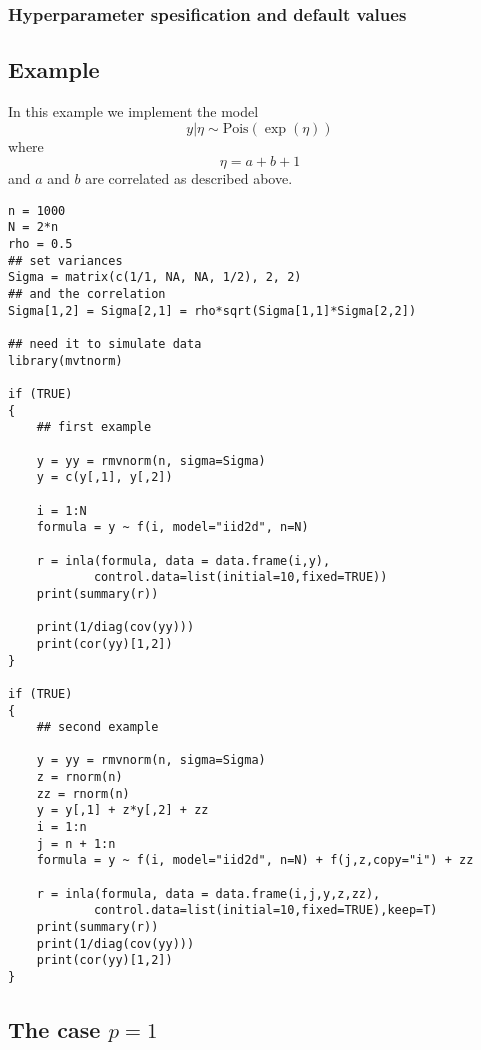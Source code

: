 \documentclass[a4paper,11pt]{article}
\begin{document}
\subsubsection*{Hyperparameter spesification and default values}



\subsection*{Example}
In this example we implement the model
\begin{displaymath}
    y|\eta\sim\mbox{Pois}(\exp(\eta))
\end{displaymath}
where
\begin{displaymath}
    \eta=a+b+1
\end{displaymath}
and $a$ and $b$ are correlated as described above.

\begin{verbatim}
n = 1000
N = 2*n
rho = 0.5
## set variances
Sigma = matrix(c(1/1, NA, NA, 1/2), 2, 2)
## and the correlation
Sigma[1,2] = Sigma[2,1] = rho*sqrt(Sigma[1,1]*Sigma[2,2])

## need it to simulate data
library(mvtnorm)

if (TRUE)
{
    ## first example
    
    y = yy = rmvnorm(n, sigma=Sigma)
    y = c(y[,1], y[,2])

    i = 1:N
    formula = y ~ f(i, model="iid2d", n=N)

    r = inla(formula, data = data.frame(i,y),
            control.data=list(initial=10,fixed=TRUE))
    print(summary(r))

    print(1/diag(cov(yy)))
    print(cor(yy)[1,2])
}

if (TRUE)
{
    ## second example

    y = yy = rmvnorm(n, sigma=Sigma)
    z = rnorm(n)
    zz = rnorm(n)
    y = y[,1] + z*y[,2] + zz
    i = 1:n
    j = n + 1:n
    formula = y ~ f(i, model="iid2d", n=N) + f(j,z,copy="i") + zz 

    r = inla(formula, data = data.frame(i,j,y,z,zz),
            control.data=list(initial=10,fixed=TRUE),keep=T)
    print(summary(r))
    print(1/diag(cov(yy)))
    print(cor(yy)[1,2])
}
\end{verbatim}

\subsection*{The case $p=1$}
\end{document}
